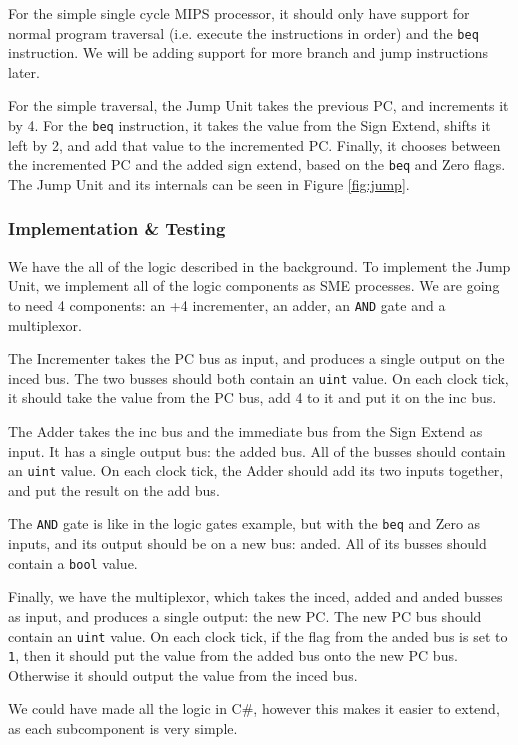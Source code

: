 For the simple single cycle MIPS processor, it should only have support for
normal program traversal (i.e. execute the instructions in order) and the
\texttt{beq} instruction. We will be adding support for more branch and jump
instructions later.

For the simple traversal, the Jump Unit takes the previous PC, and increments
it by 4. For the \texttt{beq} instruction, it takes the value from the Sign
Extend, shifts it left by 2, and add that value to the incremented PC. Finally,
it chooses between the incremented PC and the added sign extend, based on the
\texttt{beq} and Zero flags. The Jump Unit and its internals can be seen in
Figure \ref{fig:jump}.

\subsubsection*{Implementation \& Testing}
We have the all of the logic described in the background. To implement the Jump
Unit, we implement all of the logic components as SME processes. We are going
to need 4 components: an +4 incrementer, an adder, an \texttt{AND} gate and a
multiplexor.

The Incrementer takes the PC bus as input, and produces a single output on the
inced bus. The two busses should both contain an \texttt{uint} value. On each
clock tick, it should take the value from the PC bus, add 4 to it and put it on
the inc bus.

The Adder takes the inc bus and the immediate bus from the Sign Extend as
input. It has a single output bus: the added bus. All of the busses should
contain an \texttt{uint} value. On each clock tick, the Adder should add its
two inputs together, and put the result on the add bus.

The \texttt{AND} gate is like in the logic gates example, but with the
\texttt{beq} and Zero as inputs, and its output should be on a new bus: anded.
All of its busses should contain a \texttt{bool} value.

Finally, we have the multiplexor, which takes the inced, added and anded busses
as input, and produces a single output: the new PC. The new PC bus should
contain an \texttt{uint} value. On each clock tick, if the flag from the anded
bus is set to \texttt{1}, then it should put the value from the added bus onto
the new PC bus. Otherwise it should output the value from the inced bus.

We could have made all the logic in C\#, however this makes it easier to
extend, as each subcomponent is very simple.

